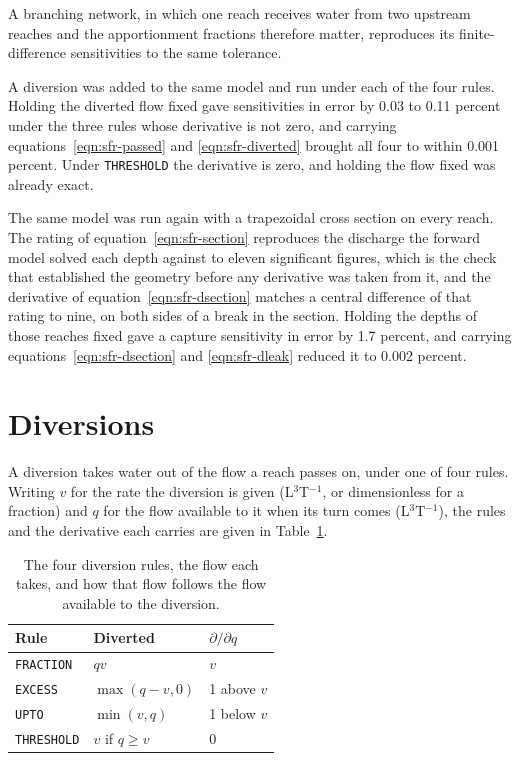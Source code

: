 A branching network, in which one reach receives water from two upstream reaches and the apportionment fractions therefore matter, reproduces its finite-difference sensitivities to the same tolerance.

A diversion was added to the same model and run under each of the four rules. Holding the diverted flow fixed gave sensitivities in error by 0.03 to 0.11 percent under the three rules whose derivative is not zero, and carrying equations~\ref{eqn:sfr-passed} and \ref{eqn:sfr-diverted} brought all four to within 0.001 percent. Under \texttt{THRESHOLD} the derivative is zero, and holding the flow fixed was already exact.

The same model was run again with a trapezoidal cross section on every reach. The rating of equation~\ref{eqn:sfr-section} reproduces the discharge the forward model solved each depth against to eleven significant figures, which is the check that established the geometry before any derivative was taken from it, and the derivative of equation~\ref{eqn:sfr-dsection} matches a central difference of that rating to nine, on both sides of a break in the section. Holding the depths of those reaches fixed gave a capture sensitivity in error by 1.7 percent, and carrying equations~\ref{eqn:sfr-dsection} and \ref{eqn:sfr-dleak} reduced it to 0.002 percent.

\section*{Diversions}

A diversion takes water out of the flow a reach passes on, under one of four rules. Writing $v$ for the rate the diversion is given (L$^{3}$T$^{-1}$, or dimensionless for a fraction) and $q$ for the flow available to it when its turn comes (L$^{3}$T$^{-1}$), the rules and the derivative each carries are given in Table~\ref{tab:sfr-rules}.

\begin{table}[htb]
	\centering
	\caption{The four diversion rules, the flow each takes, and how that flow
	follows the flow available to the diversion.}
	\label{tab:sfr-rules}
	\small
	\begin{tabular}{lll}
		\toprule
		Rule & Diverted & $\partial / \partial q$ \\
		\midrule
		\texttt{FRACTION}  & $q v$          & $v$ \\
		\texttt{EXCESS}    & $\max(q - v, 0)$ & 1 above $v$ \\
		\texttt{UPTO}      & $\min(v, q)$     & 1 below $v$ \\
		\texttt{THRESHOLD} & $v$ if $q \geq v$ & 0 \\
		\bottomrule
	\end{tabular}
\end{table}

